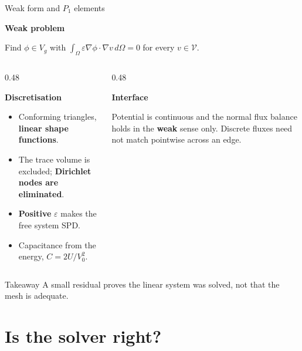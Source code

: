 \documentclass[aspectratio=169,10pt]{beamer}
\newenvironment{plainsection}[1]{%
  \par\vspace{0.6ex}\begingroup\footnotesize
  {\small\bfseries #1\par}\vspace{0.45ex}%
}{\par\endgroup\vspace{0.8ex}}
\begin{document}
\begin{frame}{Weak form and $P_1$ elements}
  \begin{plainsection}{Weak problem}
    Find $\phi\in V_g$ with
    $\displaystyle\int_{\Omega}\varepsilon\nabla\phi\cdot\nabla v\,d\Omega=0$
    for every $v\in\mathcal V$.
  \end{plainsection}
  \begin{columns}[T]
    \begin{column}{0.48\textwidth}
      \begin{plainsection}{Discretisation}
        \begin{itemize}
          \item Conforming triangles, \textbf{linear shape functions}.
          \item The trace volume is excluded; \textbf{Dirichlet nodes are eliminated}.
          \item \textbf{Positive} $\varepsilon$ makes the free system SPD.
          \item Capacitance from the energy, $C=2U/V_0^2$.
        \end{itemize}
      \end{plainsection}
    \end{column}
    \begin{column}{0.48\textwidth}
      \begin{plainsection}{Interface}
        Potential is continuous and the normal flux balance holds in the
        \textbf{weak} sense only. Discrete fluxes need not match pointwise
        across an edge.
      \end{plainsection}
    \end{column}
  \end{columns}
  \begin{alertblock}{Takeaway}
    A small residual proves the linear system was solved, not that the mesh is adequate.
  \end{alertblock}
\end{frame}

\section{Is the solver right?}
\end{document}
